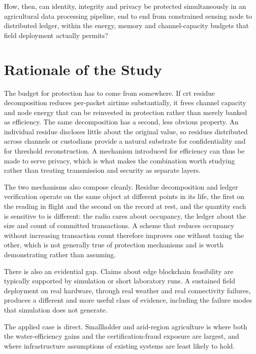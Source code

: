 \documentclass[12pt,a4paper,oneside]{book}
\begin{document}
How, then, can identity, integrity and privacy be protected simultaneously in an agricultural data
processing pipeline, end to end from constrained sensing node to distributed
ledger, within the energy, memory and channel-capacity budgets that field
deployment actually permits?

\section{Rationale of the Study}
\label{sec:rationale}

The budget for protection has to come from somewhere. If
\gls{crt} residue decomposition reduces per-packet airtime substantially, it
frees channel capacity and node energy that can be reinvested in protection
rather than merely banked as efficiency. The same decomposition has a second,
less obvious property. An individual residue discloses little about the original
value, so residues distributed across channels or custodians provide a natural
substrate for confidentiality and for threshold reconstruction. A mechanism
introduced for efficiency can thus be made to serve privacy, which is what makes
the combination worth studying rather than treating transmission and security as
separate layers.

The two mechanisms also compose cleanly. Residue
decomposition and ledger verification operate on the same object at different
points in its life, the first on the reading in flight and the second on the
record at rest, and the quantity each is sensitive to is different: the radio
cares about occupancy, the ledger about the size and count of committed
transactions. A scheme that reduces occupancy without increasing transaction
count therefore improves one without taxing the other, which is not generally
true of protection mechanisms and is worth demonstrating rather than assuming.

There is also an evidential gap. Claims about edge blockchain feasibility are
typically supported by simulation or short laboratory runs. A
sustained field deployment on real hardware, through real weather and real
connectivity failures, produces a different and more useful class of evidence,
including the failure modes that simulation does not generate.

The applied case is direct. Smallholder and arid-region agriculture is where
both the water-efficiency gains and the certification-fraud exposure are
largest, and where infrastructure assumptions of existing systems are least
likely to hold.
\end{document}
